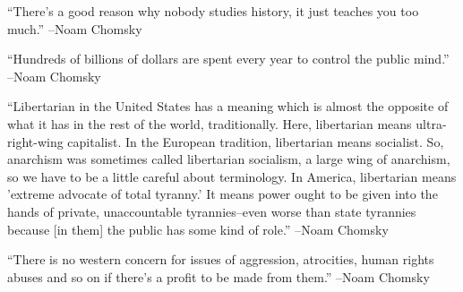 \documentclass{article}%
\begin{document}
\linebreak%
\vspace{1mm}%
\begin{minipage}{\textwidth}%
\flushleft%
“There's a good reason why nobody studies history, it just teaches you too much.”%
\linebreak%
\vspace{1mm}%
–Noam Chomsky%
\linebreak%
\vspace{1mm}%
\end{minipage}%
\linebreak%
\vspace{1mm}%
\begin{minipage}{\textwidth}%
\flushleft%
“Hundreds of billions of dollars are spent every year to control the public mind.”%
\linebreak%
\vspace{1mm}%
–Noam Chomsky%
\linebreak%
\vspace{1mm}%
\end{minipage}%
\linebreak%
\vspace{1mm}%
\begin{minipage}{\textwidth}%
\flushleft%
“Libertarian in the United States has a meaning which is almost the opposite of what it has in the rest of the world, traditionally. Here, libertarian means  ultra{-}right{-}wing capitalist. In the European tradition, libertarian means socialist.  So, anarchism was sometimes called libertarian socialism, a large wing of anarchism,  so we have to be a little careful about terminology. In America, libertarian means  'extreme advocate of total tyranny.' It means power ought to be given into the hands  of private, unaccountable tyrannies–even worse than state tyrannies because {[}in them{]} the public has some kind of role.”%
\linebreak%
\vspace{1mm}%
–Noam Chomsky%
\linebreak%
\vspace{1mm}%
\end{minipage}%
\linebreak%
\vspace{1mm}%
\begin{minipage}{\textwidth}%
\flushleft%
“There is no western concern for issues of aggression, atrocities, human rights abuses and so on if there's a profit to be made from them.”%
\linebreak%
\vspace{1mm}%
–Noam Chomsky%
\linebreak%
\vspace{1mm}%
\end{minipage}%
\end{document}
